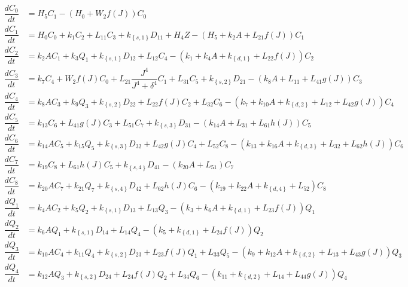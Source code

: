 \begin{align*}
\dfrac{dC_{0}}{dt} & =H_{5}C_{1}-\left(H_{0}+W_{2}f\left(J\right)\right)C_{0}\\
\dfrac{dC_{1}}{dt} & =H_{0}C_{0}+k_{1}C_{2}+L_{11}C_{3}+k_\left\{s,1\right\}D_{11}+H_{4}Z-\left(H_{5}+k_{2}A+L_{21}f\left(J\right)\right)C_{1}\\
\dfrac{dC_{2}}{dt} & =k_{2}AC_{1}+k_{3}Q_{1}+k_\left\{s,1\right\}D_{12}+L_{12}C_{4}-\left(k_{1}+k_{4}A+k_\left\{d,1\right\}+L_{22}f\left(J\right)\right)C_{2}\\
\dfrac{dC_{3}}{dt} & =k_{7}C_{4}+W_{2}f\left(J\right)C_{0}+L_{21}\dfrac{J^{4}}{J^{4}+\delta^{4}}C_{1}+L_{31}C_{5}+k_\left\{s,2\right\}D_{21}-\left(k_{8}A+L_{11}+L_{41}g\left(J\right)\right)C_{3}\\
\dfrac{dC_{4}}{dt} & =k_{8}AC_{3}+k_{9}Q_{3}+k_\left\{s,2\right\}D_{22}+L_{22}f\left(J\right)C_{2}+L_{32}C_{6}-\left(k_{7}+k_{10}A+k_\left\{d,2\right\}+L_{12}+L_{42}g\left(J\right)\right)C_{4}\\
\dfrac{dC_{5}}{dt} & =k_{13}C_{6}+L_{41}g\left(J\right)C_{3}+L_{51}C_{7}+k_\left\{s,3\right\}D_{31}-\left(k_{14}A+L_{31}+L_{61}h\left(J\right)\right)C_{5}\\
\dfrac{dC_{6}}{dt} & =k_{14}AC_{5}+k_{15}Q_{5}+k_\left\{s,3\right\}D_{32}+L_{42}g\left(J\right)C_{4}+L_{52}C_{8}-\left(k_{13}+k_{16}A+k_\left\{d,3\right\}+L_{32}+L_{62}h\left(J\right)\right)C_{6}\\
\dfrac{dC_{7}}{dt} & =k_{19}C_{8}+L_{61}h\left(J\right)C_{5}+k_\left\{s,4\right\}D_{41}-\left(k_{20}A+L_{51}\right)C_{7}\\
\dfrac{dC_{8}}{dt} & =k_{20}AC_{7}+k_{21}Q_{7}+k_\left\{s,4\right\}D_{42}+L_{62}h\left(J\right)C_{6}-\left(k_{19}+k_{22}A+k_\left\{d,4\right\}+L_{52}\right)C_{8}\\
\dfrac{dQ_{1}}{dt} & =k_{4}AC_{2}+k_{5}Q_{2}+k_\left\{s,1\right\}D_{13}+L_{13}Q_{3}-\left(k_{3}+k_{6}A+k_\left\{d,1\right\}+L_{23}f\left(J\right)\right)Q_{1}\\
\dfrac{dQ_{2}}{dt} & =k_{6}AQ_{1}+k_\left\{s,1\right\}D_{14}+L_{14}Q_{4}-\left(k_{5}+k_\left\{d,1\right\}+L_{24}f\left(J\right)\right)Q_{2}\\
\dfrac{dQ_{3}}{dt} & =k_{10}AC_{4}+k_{11}Q_{4}+k_\left\{s,2\right\}D_{23}+L_{23}f\left(J\right)Q_{1}+L_{33}Q_{5}-\left(k_{9}+k_{12}A+k_\left\{d,2\right\}+L_{13}+L_{43}g\left(J\right)\right)Q_{3}\\
\dfrac{dQ_{4}}{dt} & =k_{12}AQ_{3}+k_\left\{s,2\right\}D_{24}+L_{24}f\left(J\right)Q_{2}+L_{34}Q_{6}-\left(k_{11}+k_\left\{d,2\right\}+L_{14}+L_{44}g\left(J\right)\right)Q_{4}\\

\end{align*}
